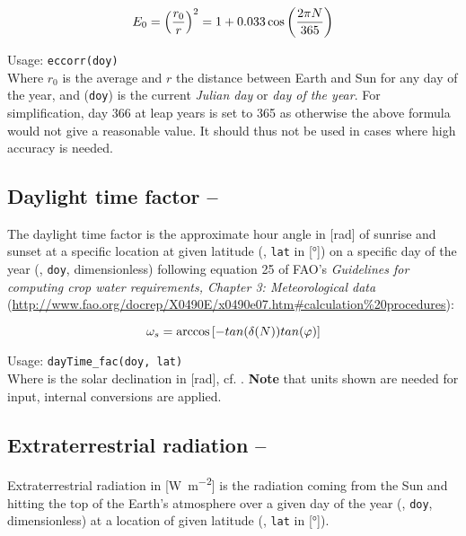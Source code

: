 \begin{equation}\label{eqn:meteo:eccorr}
E_{0}{} = \left( \frac{r_0}{r} \right)^2 = 1 + 0.033 \cos \left(\frac{2 \pi N}{365} \right)
\end{equation}

\noindent
Usage:
\verb!eccorr(doy)!\\

Where $r_0$ is the average and $r$ the distance between Earth and Sun for any day of the year, and \doy{} (\verb!doy!) is the current \emph{Julian day} or \emph{day of the year}. For simplification, day \num{366} at leap years is set to \num{365} as otherwise the above formula would not give a reasonable value. It should thus not be used in cases where high accuracy is needed.


\subsection{Daylight time factor -- \dayTimeFac} \label{sec:meteo:daytimefac}
The daylight time factor \dayTimeFac{} is the approximate hour angle in [\si{\radian}] of sunrise and sunset at a specific location at given latitude (\lat{}, \verb!lat! in [\si{\degree}]) on a specific day of the year (\doy{}, \verb!doy!, dimensionless) following equation 25 of FAO's \emph{Guidelines for computing crop water requirements, Chapter 3: Meteorological data} (\url{http://www.fao.org/docrep/X0490E/x0490e07.htm#calculation\%20procedures}):

\begin{equation}\label{eqn:meteo:daytimefac}
\omega_{s}{} = \arccos \left[ -tan(\delta{(\ensuremath{N})}) tan(\varphi{}) \right]
\end{equation}

\noindent
Usage:
\verb!dayTime_fac(doy, lat)!\\

Where \solDecl{} is the solar declination in [\si{\radian}], cf. . \textbf{Note} that units shown are needed for input, internal conversions are applied.


\subsection{Extraterrestrial radiation -- \radExtraterr} \label{sec:meteo:radex}
Extraterrestrial radiation \radExtraterr{} in [\si{\watt\per\metre\squared}] is the radiation coming from the Sun and hitting the top of the Earth's atmosphere over a given day of the year (\doy{}, \verb!doy!, dimensionless) at a location of given latitude (\lat{}, \verb!lat! in [\si{\degree}]).

